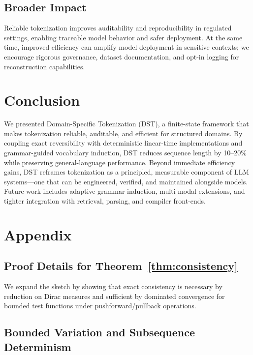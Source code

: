 \subsection{Broader Impact}

Reliable tokenization improves auditability and reproducibility in regulated settings, enabling traceable model behavior and safer deployment.
At the same time, improved efficiency can amplify model deployment in sensitive contexts; we encourage rigorous governance, dataset documentation, and opt-in logging for reconstruction capabilities.

\section{Conclusion}

We presented Domain-Specific Tokenization (DST), a finite-state framework that makes tokenization reliable, auditable, and efficient for structured domains.
By coupling exact reversibility with deterministic linear-time implementations and grammar-guided vocabulary induction, DST reduces sequence length by 10–20\% while preserving general-language performance.
Beyond immediate efficiency gains, DST reframes tokenization as a principled, measurable component of LLM systems—one that can be engineered, verified, and maintained alongside models.
Future work includes adaptive grammar induction, multi-modal extensions, and tighter integration with retrieval, parsing, and compiler front-ends.

\appendix
\section{Appendix}


\subsection{Proof Details for Theorem~\ref{thm:consistency}}

We expand the sketch by showing that exact consistency is necessary by reduction on Dirac measures and sufficient by dominated convergence for bounded test functions under pushforward/pullback operations.

\subsection{Bounded Variation and Subsequence Determinism}

